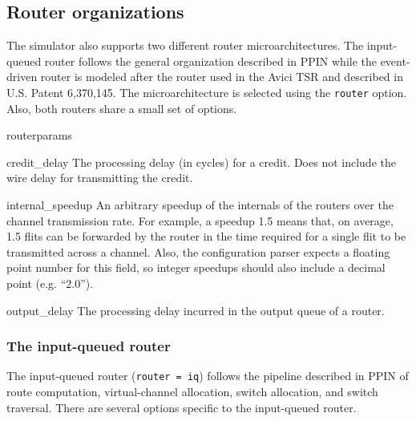 \documentclass[11pt]{article}
\begin{document}
\subsection{Router organizations}

The simulator also supports two different router microarchitectures.
The input-queued router follows the general organization described in
PPIN while the event-driven router is modeled after the router used in
the Avici TSR and described in U.S. Patent 6,370,145.  The
microarchitecture is selected using the \texttt{router} option.  Also,
both routers share a small set of options.

\begin{opt_list}{routerparams}
\item[credit\_delay] The processing delay (in cycles) for a credit.
Does not include the wire delay for transmitting the credit.

\item[internal\_speedup] An arbitrary speedup of the internals of the
routers over the channel transmission rate.  For example, a speedup
1.5 means that, on average, 1.5 flits can be forwarded by the router
in the time required for a single flit to be transmitted across a
channel.  Also, the configuration parser expects a floating point
number for this field, so integer speedups should also include a
decimal point (e.g. ``2.0'').

\item[output\_delay] The processing delay incurred in the output queue
of a router.
\end{opt_list}

\subsubsection{The input-queued router}
\label{sec:iq_router}

The input-queued router (\texttt{router = iq}) follows the pipeline
described in PPIN of route computation, virtual-channel allocation,
switch allocation, and switch traversal.  There are several options
specific to the input-queued router.
\end{document}
